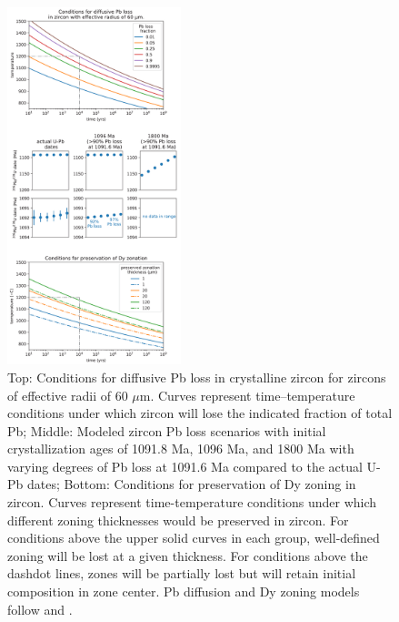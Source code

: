 \begin{figure}[h!]
\noindent\includegraphics[width=0.45\textwidth]{figure/Zhang2021/diffusive_loss.pdf}
\centering
\caption{\footnotesize{Top: Conditions for diffusive Pb loss in crystalline zircon for zircons of effective radii of 60 $\mu$m. Curves represent time--temperature conditions under which zircon will lose the indicated fraction of total Pb; Middle: Modeled zircon Pb loss scenarios with initial crystallization ages of 1091.8 Ma, 1096 Ma, and 1800 Ma with varying degrees of Pb loss at 1091.6 Ma compared to the actual U-Pb dates; Bottom: Conditions for preservation of Dy zoning in zircon. Curves represent time-temperature conditions under which different zoning thicknesses would be preserved in zircon. For conditions above the upper solid curves in each group, well-defined zoning will be lost at a given thickness. For conditions above the dashdot lines, zones will be partially lost but will retain initial composition in zone center. Pb diffusion and Dy zoning models follow \cite{Cherniak2001a} and \cite{Cherniak1997a}.}}
\label{fig:diffusive_loss}
\end{figure}

